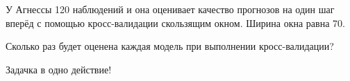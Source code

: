 
\begin{question}
У Агнессы 120 наблюдений и она оценивает качество прогнозов на один шаг вперёд с помощью кросс-валидации
скользящим окном. Ширина окна равна 70.

Сколько раз будет оценена каждая модель при выполнении кросс-валидации?
\end{question}

\begin{solution}
Задачка в одно действие!
\end{solution}

